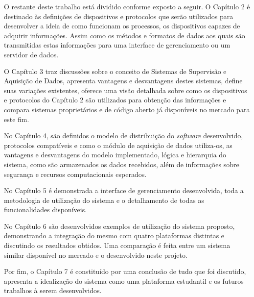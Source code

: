 O restante deste trabalho está dividido conforme exposto a seguir. O Capítulo 2 é destinado às definições de dispositivos e protocolos que serão utilizados para desenvolver a ideia de como funcionam os processos, os dispositivos capazes de adquirir informações. Assim como os métodos e formatos de dados aos quais são transmitidas estas informações para uma interface de gerenciamento ou um servidor de dados.

O Capítulo 3 traz discussões sobre o conceito de Sistemas de Supervisão e Aquisição de Dados, apresenta vantagens e desvantagens destes sistemas, define suas variações existentes, oferece uma visão detalhada sobre como os dispositivos e protocolos do Capítulo 2 são utilizados para obtenção das informações e compara sistemas proprietários e de código aberto já disponíveis no mercado para este fim.

No Capítulo 4, são definidos o modelo de distribuição do \textit{software} desenvolvido, protocolos compatíveis e como o módulo de aquisição de dados utiliza-os, as vantagens e desvantagens do modelo implementado, lógica e hierarquia do sistema, como são armazenados os dados recebidos, além de informações sobre segurança e recursos computacionais esperados.

No Capítulo 5 é demonstrada a interface de gerenciamento desenvolvida, toda a metodologia de utilização do sistema e o detalhamento de todas as funcionalidades disponíveis.

No Capítulo 6 são desenvolvidos exemplos de utilização do sistema proposto, demonstrando a integração do mesmo com quatro plataformas distintas e discutindo os resultados obtidos. Uma comparação é feita entre um sistema similar disponível no mercado e o desenvolvido neste projeto.

Por fim, o Capítulo 7 é constituído por uma conclusão de tudo que foi discutido, apresenta a idealização do sistema como uma plataforma estudantil e os futuros trabalhos à serem desenvolvidos.